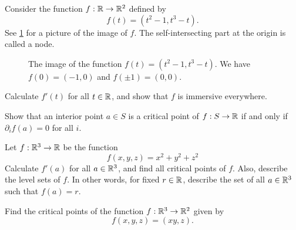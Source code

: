 \begin{exercise} \label{node}
	Consider the function $f : \mathbb{R} \to \mathbb{R}^2$ defined by
	\[ f(t) = (t^2-1, t^3-t). \]
	See \cref{node-graph} for a picture of the image of $f$. The self-intersecting part at the origin is called a node. 
	\begin{figure}
		\begin{center}
		\end{center}
		\caption{The image of the function $f(t) = (t^2-1, t^3-t)$. We have $f(0) = (-1,0)$ and $f(\pm 1) = (0,0)$.}  \label{node-graph}
	\end{figure}
	Calculate $f'(t)$ for all $t \in \mathbb{R}$, and show that $f$ is immersive everywhere.
\end{exercise}

\begin{exercise}
	Show that an interior point $a \in S$ is a critical point of $f : S \to \mathbb{R}$ if and only if $\partial_i f(a) = 0$ for all $i$. 
\end{exercise}

\begin{exercise} \label{sphere-fibration}
	Let $f : \mathbb{R}^3 \to \mathbb{R}$ be the function
	\[ f(x,y,z) = x^2 + y^2 + z^2 \]
	Calculate $f'(a)$ for all $a \in \mathbb{R}^3$, and find all critical points of $f$. Also, describe the level sets of $f$. In other words, for fixed $r \in \mathbb{R}$, describe the set of all $a \in \mathbb{R}^3$ such that $f(a) = r$. 
\end{exercise}

\begin{exercise}
	Find the critical points of the function $f : \mathbb{R}^3 \to \mathbb{R}^2$ given by \[ f(x,y,z) = (xy, z). \]
\end{exercise}

